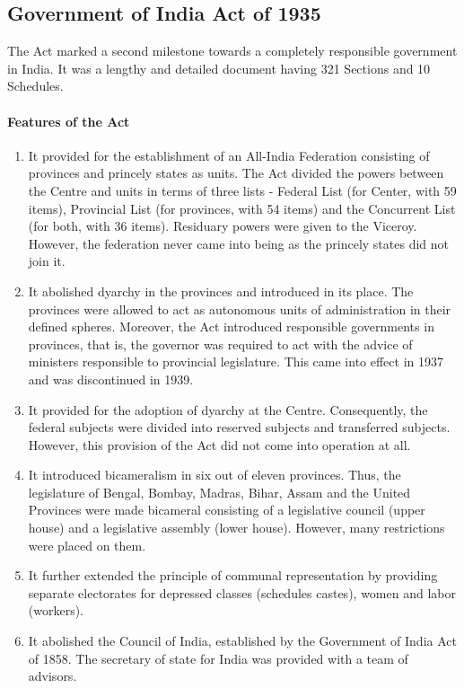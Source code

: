 \subsection{Government of India Act of 1935}

The Act marked a second milestone towards a completely responsible government in India. It was a lengthy and detailed document having 321 Sections and 10 Schedules.

\paragraph{Features of the Act}
\begin{enumerate}
  \item It provided for the establishment of an All-India Federation consisting of provinces and princely states as units. The Act divided the powers between the Centre and units in terms of three lists - Federal List (for Center, with 59 items), Provincial List (for provinces, with 54 items) and the Concurrent List (for both, with 36 items). Residuary powers were given to the Viceroy. However, the federation never came into being as the princely states did not join it.
  \item It abolished dyarchy in the provinces and introduced  in its place. The provinces were allowed to act as autonomous units of administration in their defined spheres. Moreover, the Act introduced responsible governments in provinces, that is, the governor was required to act with the advice of ministers responsible to provincial legislature. This came into effect in 1937 and was discontinued in 1939.
  \item It provided for the adoption of dyarchy at the Centre. Consequently, the federal subjects were divided into reserved subjects and transferred subjects. However, this provision of the Act did not come into operation at all.
  \item It introduced bicameralism in six out of eleven provinces. Thus, the legislature of Bengal, Bombay, Madras, Bihar, Assam and the United Provinces were made bicameral consisting of a legislative council (upper house) and a legislative assembly (lower house). However, many restrictions were placed on them.
  \item It further extended the principle of communal representation by providing separate electorates for depressed classes (schedules castes), women and labor (workers).
  \item It abolished the Council of India, established by the Government of India Act of 1858. The secretary of state for India was provided with a team of advisors.

\end{enumerate}

